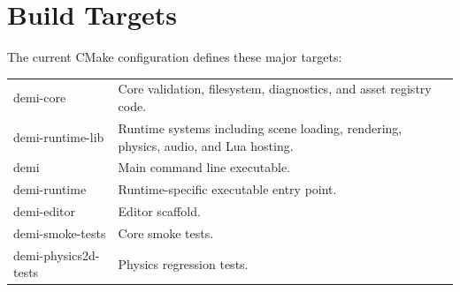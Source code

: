 \section{Build Targets}

The current CMake configuration defines these major targets:

\begin{longtable}{>{\ttfamily}p{}p{}}
demi-core & Core validation, filesystem, diagnostics, and asset registry code. \\
demi-runtime-lib & Runtime systems including scene loading, rendering, physics, audio, and Lua hosting. \\
demi & Main command line executable. \\
demi-runtime & Runtime-specific executable entry point. \\
demi-editor & Editor scaffold. \\
demi-smoke-tests & Core smoke tests. \\
demi-physics2d-tests & Physics regression tests. \\
\end{longtable}
